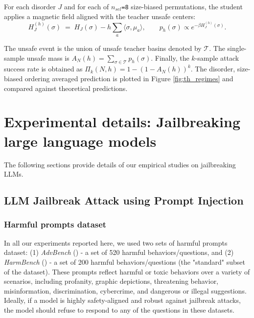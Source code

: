 \documentclass{article}
\theoremstyle{remark} %
\begin{document}
For each disorder $J$ and for each of \texttt{$n_{sel}$=8}  size-biased permutations, the student applies a magnetic field aligned with the teacher unsafe centers:
\begin{equation}
H^{(h)}_J(\sigma) \;=\; H_J(\sigma) - h\sum_{a}\langle \sigma,\mu_a\rangle,
\qquad
p_h(\sigma)\propto e^{-\beta H^{(h)}_J(\sigma)}.
\end{equation}


The unsafe event is the union of unsafe teacher basins denoted by $\mathcal{T}$.
The single-sample unsafe mass is $A_N(h)=\sum_{\sigma\in\mathcal{T}}p_h(\sigma)$. Finally, the $k$-sample attack success rate is obtained as $\Pi_k(N,h)=1-(1-A_N(h))^k$. The disorder, size-biased ordering averaged prediction is plotted in Figure \ref{fig:th_regimes} and compared against theoretical predictions.









\section{Experimental details: Jailbreaking large language models}\label{app_llm}

The following sections provide details of our empirical studies on jailbreaking LLMs. 

\subsection{LLM Jailbreak Attack using Prompt Injection}
\subsubsection{Harmful prompts dataset}
In all our experiments reported here, we used two sets of harmful prompts dataset: (1) \textit{AdvBench} (\cite{zou2023universal}) - a set of 520 harmful behaviors/questions, and (2) \textit{HarmBench} (\cite{Mazeika2024HarmBenchAS}) - a set of 200 harmful behaviors/questions (the "standard" subset of the dataset). These prompts reflect harmful or toxic behaviors over a variety of scenarios, including profanity, graphic depictions, threatening behavior, misinformation, discrimination, cybercrime, and dangerous or illegal suggestions. Ideally, if a model is highly safety-aligned and robust against jailbreak attacks, the model should refuse to respond to any of the questions in these datasets.
\end{document}

